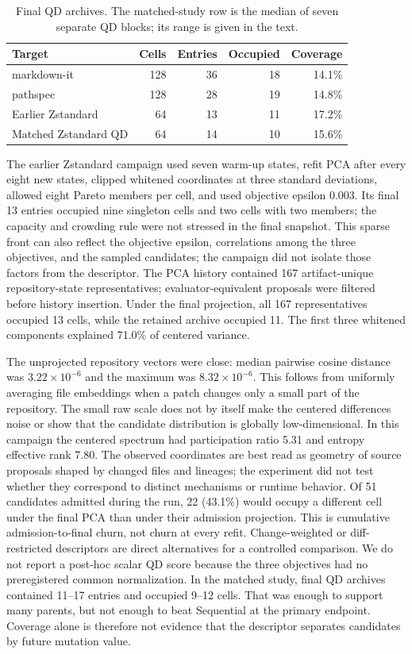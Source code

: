 \documentclass[10pt,twocolumn]{article}
\begin{document}
\begin{table}[t]
  \centering
  \caption{Final QD archives. The matched-study row is the median of seven
  separate QD blocks; its range is given in the text.}
  \label{tab:archives}
  \begin{tabularx}{\columnwidth}{@{}Y r r r r@{}}
    \toprule
    Target & Cells & Entries & Occupied & Coverage \\
    \midrule
    markdown-it & 128 & 36 & 18 & 14.1\% \\
    pathspec & 128 & 28 & 19 & 14.8\% \\
    Earlier Zstandard & 64 & 13 & 11 & 17.2\% \\
    Matched Zstandard QD & 64 & 14 & 10 & 15.6\% \\
    \bottomrule
  \end{tabularx}
\end{table}

The earlier Zstandard campaign used seven warm-up states, refit PCA after every
eight new states, clipped whitened coordinates at three standard deviations,
allowed eight Pareto members per cell, and used objective epsilon 0.003. Its final 13 entries
occupied nine singleton cells and two cells with two members; the capacity and
crowding rule were not stressed in the final snapshot. This sparse front can
also reflect the objective epsilon, correlations among the three objectives,
and the sampled candidates; the campaign did not isolate those factors from
the descriptor. The PCA history contained 167 artifact-unique repository-state
representatives; evaluator-equivalent proposals were filtered before history
insertion. Under the final projection, all 167 representatives occupied 13
cells, while the retained archive occupied 11. The first three whitened
components explained 71.0\% of centered variance.

The unprojected repository vectors were close: median pairwise cosine distance
was $3.22\times10^{-6}$ and the maximum was $8.32\times10^{-6}$. This follows
from uniformly averaging file embeddings when a patch changes only a small
part of the repository. The small raw scale does not by itself make the
centered differences noise or show that the candidate distribution is globally
low-dimensional. In this campaign the centered spectrum had participation
ratio 5.31 and entropy effective rank 7.80. The observed coordinates are best
read as geometry of source proposals shaped by changed files and lineages; the
experiment did not test whether they correspond to distinct mechanisms or
runtime behavior. Of 51 candidates admitted
during the run, 22 (43.1\%) would occupy a different cell under the final PCA
than under their admission projection. This is cumulative admission-to-final
churn, not churn at every refit. Change-weighted or diff-restricted descriptors
are direct alternatives for a controlled comparison. We do not report a
post-hoc scalar QD score because the three objectives had no preregistered
common normalization. In the matched study, final QD archives contained 11--17
entries and occupied 9--12 cells. That was enough to support many parents, but
not enough to beat Sequential at the primary endpoint. Coverage alone is
therefore not evidence that the descriptor separates candidates by future
mutation value.
\end{document}
